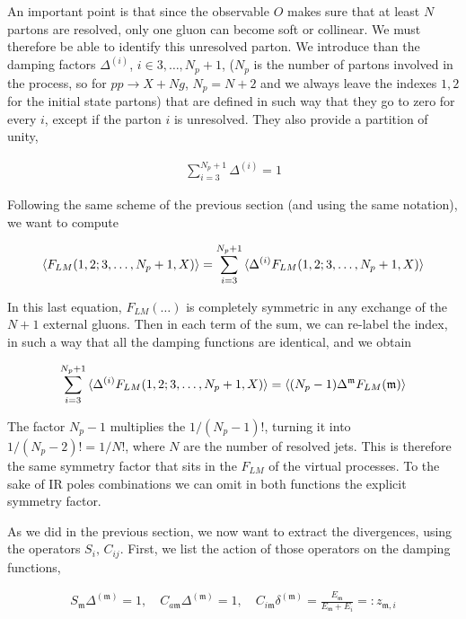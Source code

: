 \documentclass[11pt]{report}
\begin{document}
An important point is that since the observable \(O\) makes sure that at least \(N\) partons are resolved, only one gluon can become soft or collinear. We must therefore be able to identify this unresolved parton. We introduce than the damping factors \(\Delta^{(i)}\), \(i \in 3, \ldots, N_p+1\), (\(N_p\) is the number of partons involved in the process, so for \(pp \to X + N g\), \(N_p = N+2\) and we always leave the indexes \(1, 2\) for the initial state partons) that are defined in such way that they go to zero for every \(i\), except if the parton \(i\) is unresolved. They also provide a partition of unity, 

\begin{align}
    \sum_{i=3}^{N_p+1}\Delta^{(i)} = 1
\end{align}

Following the same scheme of the previous section (and using the same notation), we want to compute 

\begin{align}
    \braket{F_{LM}(1, 2; 3, \ldots, N_p +1, X)} = \sum_{i=3}^{N_p+1}\braket{\Delta^{(i)}F_{LM}(1, 2; 3, \ldots, N_p +1, X)}
\end{align}

In this last equation, \(F_{LM}(\ldots)\) is completely symmetric in any exchange of the \(N +1\) external gluons. Then in each term of the sum, we can re-label the index, in such a way that all the damping functions are identical, and we obtain 

\begin{align}
    \sum_{i=3}^{N_p+1}\braket{\Delta^{(i)}F_{LM}(1, 2; 3, \ldots, N_p +1, X)} = \braket{(N_p-1)\Delta^{\mathfrak{m}}F_{LM}(\mathfrak{m})}
\end{align}

The factor \(N_p-1\) multiplies the \(1/(N_{p}-1)!\), turning it into \(1/(N_p-2)! = 1/N!\), where \(N\) are the number of resolved jets. This is therefore the same symmetry factor that sits in the \(F_{LM}\) of the virtual processes. To the sake of IR poles combinations we can omit in both functions the explicit symmetry factor.   

As we did in the previous section, we now want to extract the divergences, using the operators \(S_i, \, C_{ij}\). First, we list the action of those operators on the damping functions, 

\begin{align}
    S_{\mathfrak{m}} \Delta^{(\mathfrak{m})} = 1, \quad C_{a\mathfrak{m}}\Delta^{(\mathfrak{m})} = 1, \quad C_{i\mathfrak{m}}\delta^{(\mathfrak{m})} = \frac{E_{\mathfrak{m}}}{E_{\mathfrak{m}} + E_i} =: z_{\mathfrak{m}, i}
\end{align}
\end{document}

